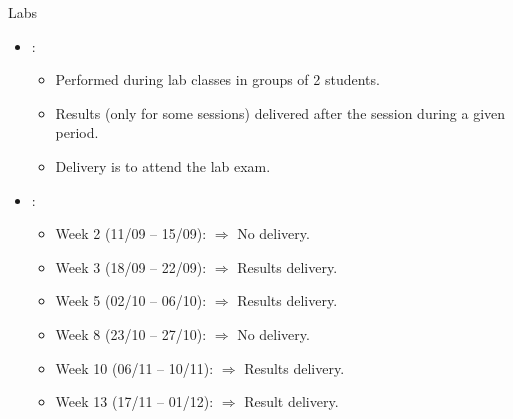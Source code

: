 \begin{frame}[t]{Labs}
\begin{itemize}
  \item {}:
    \begin{itemize}
        \item Performed during lab classes in groups of 2 students.
        \item Results (only for some sessions) delivered after the session during a given period.
        \item Delivery is  to attend the lab exam.
    \end{itemize}

  \item {}:
    \begin{itemize}
      \item Week 2 (11/09 -- 15/09):  $\Rightarrow$ No delivery.
      \item Week 3 (18/09 -- 22/09):  $\Rightarrow$ Results delivery.
      \item Week 5 (02/10 -- 06/10):  $\Rightarrow$ Results delivery.
      \item Week 8 (23/10 -- 27/10):  $\Rightarrow$ No delivery.
      \item Week 10 (06/11 -- 10/11):  $\Rightarrow$ Results delivery.
      \item Week 13 (17/11 -- 01/12):  $\Rightarrow$ Result delivery. 
    \end{itemize}
\end{itemize}
\end{frame}

